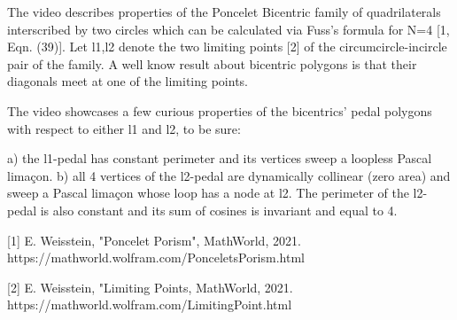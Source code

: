 The video describes properties of the Poncelet Bicentric family of quadrilaterals interscribed by two circles which can be calculated via Fuss's formula for N=4 [1, Eqn. (39)]. Let l1,l2 denote the two limiting points [2] of the circumcircle-incircle pair of the family. A well know result about bicentric polygons is that their diagonals meet at one of the limiting points.

The video showcases a few curious properties of the bicentrics' pedal polygons with respect to either l1 and l2, to be sure:

a) the l1-pedal has constant perimeter and its vertices sweep a loopless Pascal limaçon.
b) all 4 vertices of the l2-pedal are dynamically collinear (zero area) and sweep a Pascal limaçon whose loop has a node at l2. The perimeter of the l2-pedal is also constant and its sum of cosines is invariant and equal to 4.

[1] E. Weisstein, "Poncelet Porism", MathWorld, 2021. https://mathworld.wolfram.com/PonceletsPorism.html

[2] E. Weisstein, "Limiting Points, MathWorld, 2021. https://mathworld.wolfram.com/LimitingPoint.html